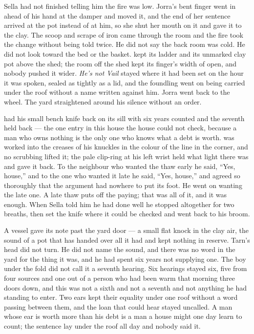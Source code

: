 Sella had not finished telling him the fire was low. Jorra's bent finger went in ahead of his hand at the damper and moved it, and the end of her sentence arrived at the pot instead of at him, so she shut her mouth on it and gave it to the clay. The scoop and scrape of iron came through the room and the fire took the change without being told twice. He did not say the back room was cold. He did not look toward the bed or the basket.  kept its ladder and its unmarked clay pot above the shed; the room off the shed kept its finger's width of open, and nobody pushed it wider. \emph{He's not Vail} stayed where it had been set on the hour it was spoken, sealed as tightly as a lid, and the foundling went on being carried under the roof without a name written against him. Jorra went back to the wheel. The yard straightened around his silence without an order.

 had his small bench knife back on its sill with six years counted and the seventh held back --- the one entry in this house the house could not check, because a man who owns nothing is the only one who knows what a debt is worth.  was worked into the creases of his knuckles in the colour of the line in the corner, and no scrubbing lifted it; the pale clip-ring at his left wrist held what light there was and gave it back. To the neighbour who wanted the thaw early he said, “Yes, house,” and to the one who wanted it late he said, “Yes, house,” and agreed so thoroughly that the argument had nowhere to put its foot. He went on wanting the late one. A late thaw puts off the paying; that was all of it, and it was enough. When Sella told him he had done well he stopped altogether for two breaths, then set the knife where it could be checked and went back to his broom.

A vessel gave its note past the yard door --- a small flat knock in the clay air, the sound of a pot that has handed over all it had and kept nothing in reserve. Tarn's head did not turn. He did not name the sound, and there was no  word in the yard for the thing it was, and he had spent six years not supplying one. The boy under the fold did not call it a seventh hearing. Six hearings stayed six, five from four sources and one out of a person who had been warm that morning three doors down, and this was not a sixth and not a seventh and not anything he had standing to enter. Two ears kept their equality under one roof without a word passing between them, and the loan that could hear stayed uncalled. A man whose ear is worth more than his debt is a man a house might one day learn to count; the sentence lay under the roof all day and nobody said it.


